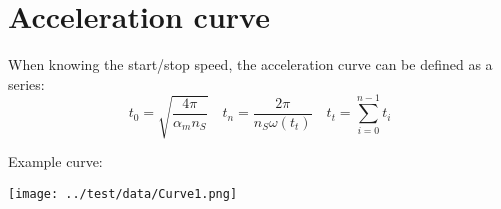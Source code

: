 \documentclass{article}
\begin{document}
\section{Acceleration curve}

    When knowing the start/stop speed, the acceleration curve can be defined as a series:
    \begin{equation}
        t_0 = \sqrt{\frac{4\pi}{\alpha_m n_S}} \quad
        t_{n} = \frac{2\pi}{n_S\omega(t_t)} \quad t_t = \sum_{i = 0}^{n - 1}{t_i}
    \end{equation}
    
    Example curve:
    \begin{center}
        \texttt{[image: ../test/data/Curve1.png]}
    \end{center}
\end{document}
